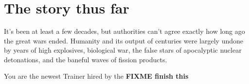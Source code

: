 \chapter{The story thus far}
\label{chap:story}
It's been at least a few decades, but authorities can't
  agree exactly how long ago the great wars ended.
Humanity and its output of centuries were largely undone by
 years of high explosives, biological war, the false stars
 of apocalyptic nuclear detonations, and the baneful
 waves of fission products.

You are the newest Trainer hired by the 
\textbf{FIXME finish this}
